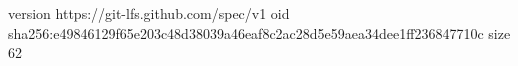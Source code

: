 version https://git-lfs.github.com/spec/v1
oid sha256:e49846129f65e203c48d38039a46eaf8c2ac28d5e59aea34dee1ff236847710c
size 62
